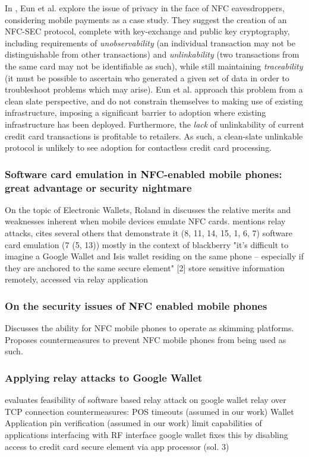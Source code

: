 In \cite{eun2013conditional}, Eun et al. explore the issue of privacy in the face of NFC eavesdroppers, considering mobile payments as a case study.
They suggest the creation of an NFC-SEC protocol, complete with key-exchange and public key cryptography, including requirements of
    \emph{unobservability} (an individual transaction may not be distinguishable from other transactions) and
    \emph{unlinkability} (two transactions from the same card may not be identifiable as such), while still maintaining
    \emph{traceability} (it must be possible to ascertain who generated a given set of data in order to troubleshoot problems which may arise).
Eun et al. approach this problem from a clean slate perspective, and do not constrain themselves to making use of existing infrastructure,
    imposing a significant barrier to adoption where existing infrastructure has been deployed.
Furthermore, the \emph{lack} of unlinkability of current credit card transactions is profitable to retailers.
As such, a clean-slate unlinkable protocol is unlikely to see adoption for contactless credit card processing.


\subsubsection*{Software card emulation in NFC-enabled mobile phones: great advantage or security nightmare}
On the topic of Electronic Wallets, Roland in \cite{roland2012software} discusses the relative merits and weaknesses inherent when mobile devices emulate NFC cards.
mentions relay attacks, cites several others that demonstrate it (8, 11, 14, 15, 1, 6, 7)
software card emulation (7 (5, 13)) mostly in the context of blackberry
"it's difficult to imagine a Google Wallet and Isis wallet residing on the same phone -- especially if they are anchored to the same secure element" [2]
store sensitive information remotely, accessed via relay application


\subsubsection*{On the security issues of NFC enabled mobile phones}
\cite{francis2010security}
Discusses the ability for NFC mobile phones to operate as skimming platforms.
Proposes countermeasures to prevent NFC mobile phones from being used as such.


\subsubsection*{Applying relay attacks to Google Wallet}
\cite{roland2013applying}
evaluates feasibility of software based relay attack on google wallet
relay over TCP connection
countermeasures:
  POS timeouts (assumed in our work)
  Wallet Application pin verification (assumed in our work)
  limit capabilities of applications interfacing with RF interface
google wallet fixes this by disabling access to credit card secure element via app processor (sol. 3)

